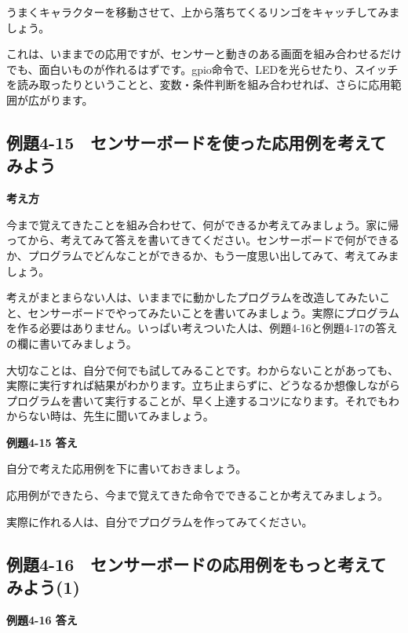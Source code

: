 \documentclass[a4paper,12pt]{jarticle}
\begin{document}
\bigskip
\bigskip
\bigskip

うまくキャラクターを移動させて、上から落ちてくるリンゴをキャッチしてみましょう。


\bigskip

これは、いままでの応用ですが、センサーと動きのある画面を組み合わせるだけでも、面白いものが作れるはずです。gpio命令で、LEDを光らせたり、スイッチを読み取ったりということと、変数・条件判断を組み合わせれば、さらに応用範囲が広がります。

\clearpage
\subsection{例題4-15　センサーボードを使った応用例を考えてみよう}
\bigskip
\bigskip

{\bfseries
考え方}

\bigskip

今まで覚えてきたことを組み合わせて、何ができるか考えてみましょう。家に帰ってから、考えてみて答えを書いてきてください。センサーボードで何ができるか、プログラムでどんなことができるか、もう一度思い出してみて、考えてみましょう。

考えがまとまらない人は、いままでに動かしたプログラムを改造してみたいこと、センサーボードでやってみたいことを書いてみましょう。実際にプログラムを作る必要はありません。いっぱい考えついた人は、例題4-16と例題4-17の答えの欄に書いてみましょう。


\bigskip

大切なことは、自分で何でも試してみることです。わからないことがあっても、実際に実行すれば結果がわかります。立ち止まらずに、どうなるか想像しながらプログラムを書いて実行することが、早く上達するコツになります。それでもわからない時は、先生に聞いてみましょう。


\bigskip

{\bfseries
例題4-15 答え}


\bigskip

自分で考えた応用例を下に書いておきましょう。

応用例ができたら、今まで覚えてきた命令でできることか考えてみましょう。

実際に作れる人は、自分でプログラムを作ってみてください。


\clearpage
\subsection{例題4-16　センサーボードの応用例をもっと考えてみよう(1)}
\bigskip
\bigskip

{\bfseries
例題4-16 答え}
\end{document}
